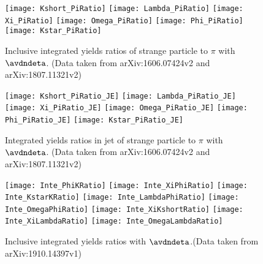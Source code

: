 \begin{figure}[ht]
	\begin{center}
		\texttt{[image: Kshort\_PiRatio]}
		\texttt{[image: Lambda\_PiRatio]}
		\texttt{[image: Xi\_PiRatio]}
		\texttt{[image: Omega\_PiRatio]}
		\texttt{[image: Phi\_PiRatio]}	\texttt{[image: Kstar\_PiRatio]}
	\end{center}
	\caption{Inclusive integrated yields ratios of strange particle to $\pi$ with $\avdndeta$. (Data taken from arXiv:1606.07424v2 and arXiv:1807.11321v2)}
	\label{fig:InclIntePartoPiRatio}
\end{figure}


\begin{figure}[ht]
	\begin{center}
		\texttt{[image: Kshort\_PiRatio\_JE]}
		\texttt{[image: Lambda\_PiRatio\_JE]}
		\texttt{[image: Xi\_PiRatio\_JE]}
		\texttt{[image: Omega\_PiRatio\_JE]}
		\texttt{[image: Phi\_PiRatio\_JE]}
		\texttt{[image: Kstar\_PiRatio\_JE]}
	\end{center}
	\caption{Integrated yields ratios in jet of strange particle to $\pi$ with $\avdndeta$. (Data taken from arXiv:1606.07424v2 and arXiv:1807.11321v2)}
	\label{fig:JEIntePartoPiRatio}
\end{figure}

\begin{figure}[ht]
	\begin{center}
				\texttt{[image: Inte\_PhiKRatio]}		\texttt{[image: Inte\_XiPhiRatio]}
		\texttt{[image: Inte\_KstarKRatio]}
		\texttt{[image: Inte\_LambdaPhiRatio]}
		\texttt{[image: Inte\_OmegaPhiRatio]}
		\texttt{[image: Inte\_XiKshortRatio]}
		\texttt{[image: Inte\_XiLambdaRatio]}
		\texttt{[image: Inte\_OmegaLambdaRatio]}
	\end{center}
	\caption{Inclusive integrated yields ratios with $\avdndeta$.(Data taken from arXiv:1910.14397v1)}
	\label{fig:InclInteParRatio}
\end{figure}

